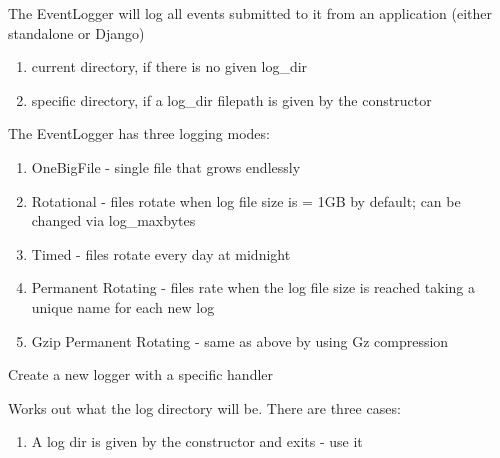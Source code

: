 \documentclass[letterpaper,10pt,english]{sphinxmanual}
\begin{document}
\begin{fulllineitems}
\label{api2.0:puppy.logging.EventLogger}
The EventLogger will log all events submitted to it from an application (either standalone or Django)
\begin{enumerate}
\item {} 
current directory, if there is no given log\_dir

\item {} 
specific directory, if a log\_dir filepath is given by the constructor

\end{enumerate}

The EventLogger has three logging modes:
\begin{enumerate}
\item {} 
OneBigFile - single file that grows endlessly

\item {} 
Rotational - files rotate when log file size is = 1GB by default; can be changed via log\_maxbytes

\item {} 
Timed - files rotate every day at midnight

\item {} 
Permanent Rotating - files rate when the log file size is reached taking a unique name for each new log

\item {} 
Gzip Permanent Rotating - same as above by using Gz compression

\end{enumerate}

\begin{fulllineitems}
\label{api2.0:puppy.logging.EventLogger.create_logger}
Create a new logger with a specific handler

\end{fulllineitems}


\begin{fulllineitems}
\label{api2.0:puppy.logging.EventLogger.get_log_dir}
Works out what the log directory will be. There are three cases:
\begin{enumerate}
\item {} 
A log dir is given by the constructor and exits - use it


\end{enumerate}
\end{fulllineitems}
\end{fulllineitems}
\end{document}
